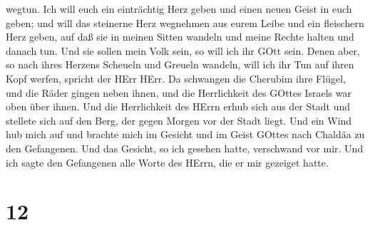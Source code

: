 wegtun.  Ich will euch ein einträchtig Herz geben und einen
neuen Geist in euch geben; und will das steinerne Herz wegnehmen aus
eurem Leibe und ein fleischern Herz geben,  auf daß sie in
meinen Sitten wandeln und meine Rechte halten und danach tun. Und sie
sollen mein Volk sein, so will ich ihr GOtt sein.  Denen
aber, so nach ihres Herzens Scheueln und Greueln wandeln, will ich ihr
Tun auf ihren Kopf werfen, spricht der HErr HErr.  Da
schwangen die Cherubim ihre Flügel, und die Räder gingen neben ihnen,
und die Herrlichkeit des GOttes Israels war oben über ihnen.
 Und die Herrlichkeit des HErrn erhub sich aus der Stadt
und stellete sich auf den Berg, der gegen Morgen vor der Stadt liegt.
 Und ein Wind hub mich auf und brachte mich im Gesicht und
im Geist GOttes nach Chaldäa zu den Gefangenen. Und das Gesicht, so ich
gesehen hatte, verschwand vor mir.  Und ich sagte den
Gefangenen alle Worte des HErrn, die er mir gezeiget hatte.

\hypertarget{section-11}{%
\section{12}\label{section-11}}

